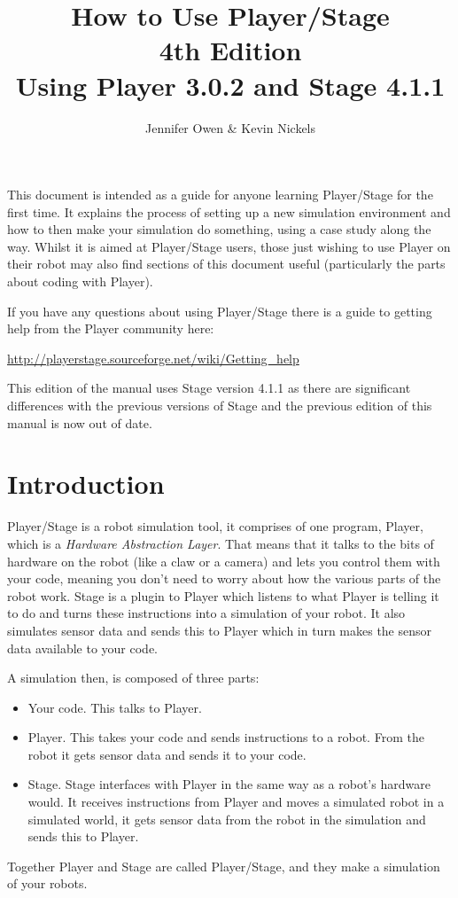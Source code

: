 \documentclass[a4paper]{report}
\title{How to Use Player/Stage\\ 
\large 4th Edition \\
\small Using Player 3.0.2 and Stage 4.1.1}
\author{Jennifer Owen \& Kevin Nickels}
\newcommand{\plst}{Player/Stage\xspace}
\newcommand{\pl}{Player\xspace}
\begin{document}
\maketitle


This document is intended as a guide for anyone learning \plst for the first time. It explains the process of setting up a new simulation environment and how to then make your simulation do something, using a case study along the way. Whilst it is aimed at \plst users, those just wishing to use \pl on their robot may also find sections of this document useful (particularly the parts about coding with Player).

If you have any questions about using \plst there is a guide to getting help from the \pl community here:
\begin{center}
	\url{http://playerstage.sourceforge.net/wiki/Getting_help}
\end{center}
This edition of the manual uses Stage version 4.1.1 as there are significant differences with the previous versions of Stage and the previous edition of this manual is now out of date. 

\tableofcontents

\chapter{Introduction}\label{sec:Introduction}
\plst is a robot simulation tool, it comprises of one program, \pl, which is a \emph{Hardware Abstraction Layer}. That means that it talks to the bits of hardware on the robot (like a claw or a camera) and lets you control them with your code, meaning you don't need to worry about how the various parts of the robot work. Stage is a plugin to \pl which listens to what \pl is telling it to do and turns these instructions into a simulation of your robot. It also simulates sensor data and sends this to \pl which in turn makes the sensor data available to your code.

A simulation then, is composed of three parts:
\begin{itemize}
\item Your code. This talks to \pl.
\item \pl. This takes your code and sends instructions to a robot. From the robot it gets sensor data and sends it to your code.
\item Stage. Stage interfaces with \pl in the same way as a robot's hardware would. It receives instructions from \pl and moves a simulated robot in a simulated world, it gets sensor data from the robot in the simulation and sends this to \pl.
\end{itemize}
Together \pl and Stage are called \plst, and they make a simulation of your robots.
\end{document}
